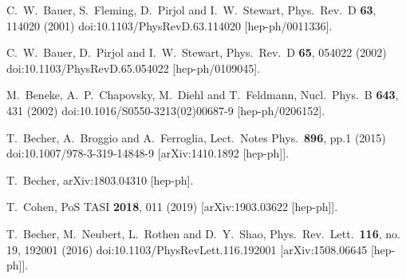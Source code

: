 \documentclass[11pt,a4paper]{article}
\begin{document}
\begin{thebibliography}{99}

  C.~W.~Bauer, S.~Fleming, D.~Pirjol and I.~W.~Stewart,
  Phys.\ Rev.\ D {\bf 63}, 114020 (2001)
  doi:10.1103/PhysRevD.63.114020
  [hep-ph/0011336].


  C.~W.~Bauer, D.~Pirjol and I.~W.~Stewart,
  Phys.\ Rev.\ D {\bf 65}, 054022 (2002)
  doi:10.1103/PhysRevD.65.054022
  [hep-ph/0109045].


  M.~Beneke, A.~P.~Chapovsky, M.~Diehl and T.~Feldmann,
  Nucl.\ Phys.\ B {\bf 643}, 431 (2002)
  doi:10.1016/S0550-3213(02)00687-9
  [hep-ph/0206152].


  T.~Becher, A.~Broggio and A.~Ferroglia,
  Lect.\ Notes Phys.\  {\bf 896}, pp.1 (2015)
  doi:10.1007/978-3-319-14848-9
  [arXiv:1410.1892 [hep-ph]].


  T.~Becher,
  arXiv:1803.04310 [hep-ph].


  T.~Cohen,
  PoS TASI {\bf 2018}, 011 (2019)
  [arXiv:1903.03622 [hep-ph]].


  T.~Becher, M.~Neubert, L.~Rothen and D.~Y.~Shao,
  Phys.\ Rev.\ Lett.\  {\bf 116}, no. 19, 192001 (2016)
  doi:10.1103/PhysRevLett.116.192001
  [arXiv:1508.06645 [hep-ph]].



\end{thebibliography}
\end{document}
